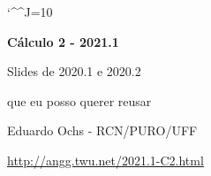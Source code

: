 \documentclass[oneside,12pt]{article}
\begin{document}
\catcode`\^^J=10

\pu

%
%

\def\mname#1{\text{[#1]}}

\def\drafturl{http://angg.twu.net/LATEX/2021-1-C2.pdf}
\def\drafturl{http://angg.twu.net/2021.1-C2.html}
\def\draftfooter{\tiny \href{\drafturl}{\jobname{}} \ColorBrown{\shorttoday{} \hours}}



%

\thispagestyle{empty}

\begin{center}

\vspace*{1.2cm}

{\bf \Large Cálculo 2 - 2021.1}

\bsk

Slides de 2020.1 e 2020.2

que eu posso querer reusar

\bsk

Eduardo Ochs - RCN/PURO/UFF

\url{http://angg.twu.net/2021.1-C2.html}

\end{center}
\end{document}

